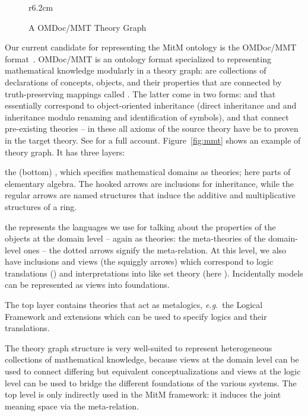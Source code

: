 \begin{wrapfigure}r{6.2cm}\centering\vspace*{-2em}
  \vspace*{-.5em}
  \caption{A OMDoc/MMT Theory Graph}\label{fig:mmt}\vspace*{-1em}
  \label{figure.omdoc.example}
\end{wrapfigure}
Our current candidate for representing the MitM ontology is the OMDoc/MMT
format~\cite{Kohlhase:OMDoc1.2,MMTSVN:on}. OMDoc/MMT is an ontology format specialized to
representing mathematical knowledge modularly in a theory graph:  are
collections of declarations of concepts, objects, and their properties that are connected
by truth-preserving mappings called . The latter come in two
forms:  and  that essentially correspond to
object-oriented inheritance (direct inheritance and and inheritance modulo renaming and
identification of symbols), and  that connect pre-existing theories -- in
these all axioms of the source theory have be to proven in the target theory. See
\cite{RabKoh:WSMSML13} for a full account. Figure~\ref{fig:mmt} shows an example of theory
graph. It has three layers:
\begin{compactenum}[\em i\rm)]
\item the (bottom) , which specifies mathematical domains as theories; here
  parts of elementary algebra. The hooked arrows are inclusions for inheritance, while the
  regular arrows are named structures that induce the additive and multiplicative
  structures of a ring.
\item the  represents the languages we use for talking about the
  properties of the objects at the domain level -- again as theories: the meta-theories of
  the domain-level ones -- the dotted arrows signify the meta-relation. At this level, we
  also have inclusions and views (the squiggly arrows) which correspond to logic
  translations () and interpretations into  like
  set theory (here ). Incidentally models can be represented as views into
  foundations.
\item The top layer contains theories that act as metalogics, \emph{e.g.}\ the Logical
  Framework  and extensions which can be used to specify logics and their
  translations.
\end{compactenum}
The theory graph structure is very well-suited to represent heterogeneous collections of
mathematical knowledge, because views at the domain level can be used to connect differing
but equivalent conceptualizations and views at the logic level can be used to bridge the
different foundations of the various systems. The top level is only indirectly used in
the MitM framework: it induces the joint meaning space via the meta-relation.

